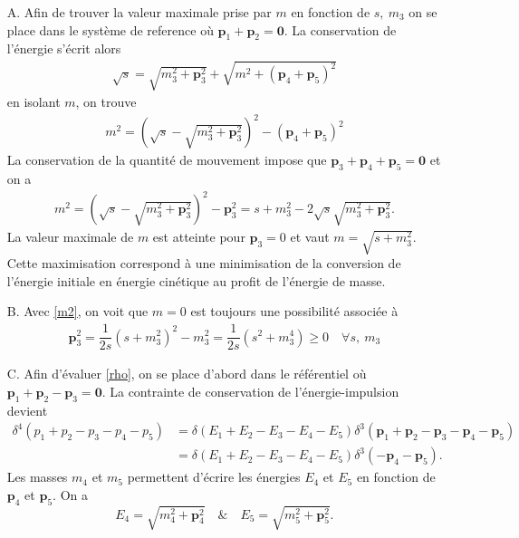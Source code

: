 \begin{enumerate}
    \item[A.] Afin de trouver la valeur maximale prise par $m$ en fonction de $s, \ m_3$ on se place dans le système de reference où $\mathbf{p}_1 + \mathbf{p}_2 = \mathbf{0}$. La conservation de l'énergie s'écrit alors 
    \begin{align*}
        \sqrt{s} = \sqrt{m_3^2 + \mathbf{p}_3^2} + \sqrt{m^2 + (\mathbf{p}_4 + \mathbf{p}_5)^2} 
    \end{align*}
    en isolant $m$, on trouve 
    \begin{align*}
        m^2 = \left(\sqrt{s} - \sqrt{m_3^2 + \mathbf{p}_3^2}\right)^2 - (\mathbf{p}_4 + \mathbf{p}_5)^2
    \end{align*}
    La conservation de la quantité de mouvement impose que $\mathbf{p}_3 + \mathbf{p}_4 + \mathbf{p}_5= \mathbf{0}$ et on a 
    \begin{align}
        m^2 = \left(\sqrt{s} - \sqrt{m_3^2 + \mathbf{p}_3^2}\right)^2 - \mathbf{p}_3^2 = s + m_3^2 - 2\sqrt{s}\sqrt{m_3^2 + \mathbf{p}_3^2}. \label{m2}
    \end{align}
    La valeur maximale de $m$ est atteinte pour $\mathbf{p}_3 = 0$ et vaut $m = \sqrt{s + m_3^2}$. Cette maximisation correspond à une minimisation de la conversion de l'énergie initiale en énergie cinétique au profit de l'énergie de masse. 
    \item[B.] Avec \eqref{m2}, on voit que $m = 0$ est toujours une possibilité associée à 
    \begin{align*}
        \mathbf{p}_3^2 = \dfrac{1}{2s}(s + m_3^2)^2 - m_3^2 = \dfrac{1}{2s}(s^2 + m_3^4) \ge 0 \quad\forall s,\ m_3
    \end{align*}
    \item[C.] Afin d'évaluer \eqref{rho}, on se place d'abord dans le référentiel où $\mathbf{p}_1+\mathbf{p}_2-\mathbf{p}_3=\mathbf{0}$. La contrainte de conservation de l'énergie-impulsion devient
    \begin{align}
        \delta^4(p_1+p_2-p_3 -p_4-p_5) &= \delta(E_1 + E_2 - E_3 - E_4 - E_5) \delta^3(\mathbf{p}_1+\mathbf{p}_2-\mathbf{p}_3 -\mathbf{p}_4-\mathbf{p}_5) \nonumber\\
        &= \delta(E_1 + E_2 - E_3 - E_4 - E_5) \delta^3(-\mathbf{p}_4-\mathbf{p}_5) \label{conservation}. 
    \end{align} 
    Les masses $m_4$ et $m_5$ permettent d'écrire les énergies $E_4$ et $E_5$ en fonction de $\mathbf{p}_4$ et $\mathbf{p}_5$. On a 
    \begin{equation}
        E_4 = \sqrt{m^2_4 + \mathbf{p}_4^2}  \quad \& \quad E_5 = \sqrt{m^2_5 + \mathbf{p}_5^2} \label{E5}. 
    \end{equation}


\end{enumerate}
